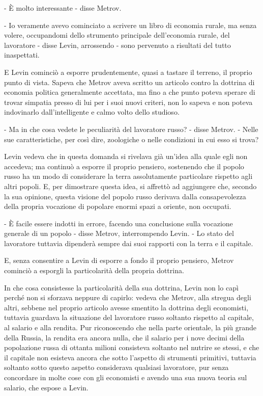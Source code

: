 - È molto interessante - disse Metrov. 

- Io veramente avevo cominciato a scrivere un libro di economia rurale, ma senza volere, occupandomi dello strumento principale dell'economia rurale, del lavoratore - disse Levin, arrossendo - sono pervenuto a risultati del tutto inaspettati. 

E Levin cominciò a esporre prudentemente, quasi a tastare il terreno, il proprio punto di vista. Sapeva che Metrov aveva scritto un articolo contro la dottrina di economia politica generalmente accettata, ma fino a che punto poteva sperare di trovar simpatia presso di lui per i suoi nuovi criteri, non lo sapeva e non poteva indovinarlo dall'intelligente e calmo volto dello studioso. 

- Ma in che cosa vedete le peculiarità del lavoratore russo? - disse Metrov. - Nelle sue caratteristiche, per così dire, zoologiche o nelle condizioni in cui esso si trova? 

Levin vedeva che in questa domanda si rivelava già un'idea alla quale egli non accedeva; ma continuò a esporre il proprio pensiero, sostenendo che il popolo russo ha un modo di considerare la terra assolutamente particolare rispetto agli altri popoli. E, per dimostrare questa idea, si affrettò ad aggiungere che, secondo la sua opinione, questa visione del popolo russo derivava dalla consapevolezza della propria vocazione di popolare enormi spazi a oriente, non occupati. 

- È facile essere indotti in errore, facendo una conclusione sulla vocazione generale di un popolo - disse Metrov, interrompendo Levin. - Lo stato del lavoratore tuttavia dipenderà sempre dai suoi rapporti con la terra e il capitale. 

E, senza consentire a Levin di esporre a fondo il proprio pensiero, Metrov cominciò a esporgli la particolarità della propria dottrina. 

In che cosa consistesse la particolarità della sua dottrina, Levin non lo capì perché non si sforzava neppure di capirlo: vedeva che Metrov, alla stregua degli altri, sebbene nel proprio articolo avesse smentito la dottrina degli economisti, tuttavia guardava la situazione del lavoratore russo soltanto rispetto al capitale, al salario e alla rendita. Pur riconoscendo che nella parte orientale, la più grande della Russia, la rendita era ancora nulla, che il salario per i nove decimi della popolazione russa di ottanta milioni consisteva soltanto nel nutrire se stessi, e che il capitale non esisteva ancora che sotto l'aspetto di strumenti primitivi, tuttavia soltanto sotto questo aspetto considerava qualsiasi lavoratore, pur senza concordare in molte cose con gli economisti e avendo una sua nuova teoria sul salario, che espose a Levin. 

